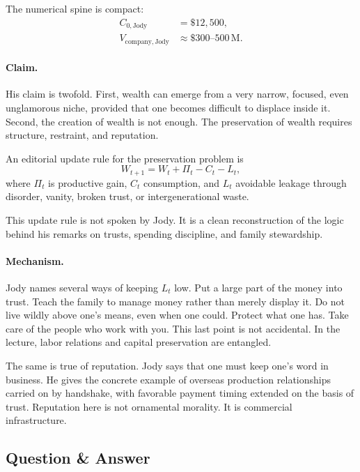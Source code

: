 The numerical spine is compact:
\begin{align}
C_{0,\mathrm{Jody}} &= \$12{,}500,\\
V_{\mathrm{company,Jody}} &\approx \$300\text{--}500\,\mathrm{M}.
\end{align}

\paragraph{Claim.}
His claim is twofold. First, wealth can emerge from a very narrow, focused, even unglamorous niche, provided that one becomes difficult to displace inside it. Second, the creation of wealth is not enough. The preservation of wealth requires structure, restraint, and reputation.

An editorial update rule for the preservation problem is
\begin{equation}
W_{t+1} = W_t + \Pi_t - C_t - L_t,
\end{equation}
where \(\Pi_t\) is productive gain, \(C_t\) consumption, and \(L_t\) avoidable leakage through disorder, vanity, broken trust, or intergenerational waste.

\begin{remark}
This update rule is not spoken by Jody. It is a clean reconstruction of the logic behind his remarks on trusts, spending discipline, and family stewardship.
\end{remark}

\paragraph{Mechanism.}
Jody names several ways of keeping \(L_t\) low. Put a large part of the money into trust. Teach the family to manage money rather than merely display it. Do not live wildly above one's means, even when one could. Protect what one has. Take care of the people who work with you. This last point is not accidental. In the lecture, labor relations and capital preservation are entangled.

The same is true of reputation. Jody says that one must keep one's word in business. He gives the concrete example of overseas production relationships carried on by handshake, with favorable payment timing extended on the basis of trust. Reputation here is not ornamental morality. It is commercial infrastructure.

\subsection{Question \& Answer}

